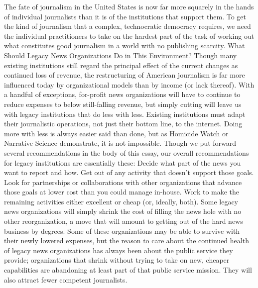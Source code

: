 The fate of journalism in the United States is now far more squarely in the hands
of individual journalists than it is of the institutions that support them. To get the
kind of journalism that a complex, technocratic democracy requires, we need
the individual practitioners to take on the hardest part of the task of working out
what constitutes good journalism in a world with no publishing scarcity.
What Should Legacy News Organizations Do in This Environment?
Though many existing institutions still regard the principal effect of the current
changes as continued loss of revenue, the restructuring of American journalism
is far more influenced today by organizational models than by income (or lack
thereof). With a handful of exceptions, for-profit news organizations will have
to continue to reduce expenses to below still-falling revenue, but simply cutting
will leave us with legacy institutions that do less with less.
Existing institutions must adapt their journalistic operations, not just their bottom
line, to the internet. Doing more with less is always easier said than done,
but as Homicide Watch or Narrative Science demonstrate, it is not impossible.
Though we put forward several recommendations in the body of this essay, our
overall recommendations for legacy institutions are essentially these:
Decide what part of the news you want to report and how. Get out
of any activity that doesn’t support those goals. Look for partnerships
or collaborations with other organizations that advance those goals at
lower cost than you could manage in-house. Work to make the remaining
activities either excellent or cheap (or, ideally, both).
Some legacy news organizations will simply shrink the cost of filling the news
hole with no other reorganization, a move that will amount to getting out of the
hard news business by degrees. Some of these organizations may be able to survive
with their newly lowered expenses, but the reason to care about the continued
health of legacy news organizations has always been about the public service
they provide; organizations that shrink without trying to take on new, cheaper
capabilities are abandoning at least part of that public service mission. They will
also attract fewer competent journalists.

